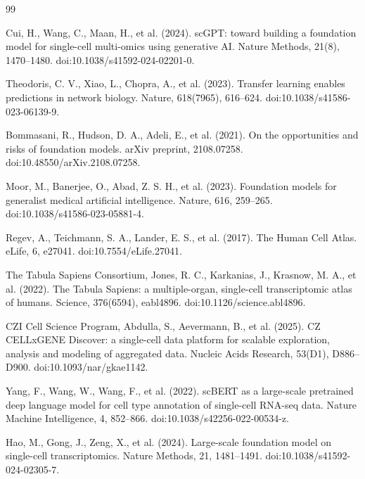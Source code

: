 \documentclass[11pt,a4paper]{article}
\begin{document}
\begin{thebibliography}{99}

Cui, H., Wang, C., Maan, H., et al. (2024).
\newblock scGPT: toward building a foundation model for single-cell multi-omics using generative AI.
\newblock Nature Methods, 21(8), 1470--1480. doi:10.1038/s41592-024-02201-0.

Theodoris, C. V., Xiao, L., Chopra, A., et al. (2023).
\newblock Transfer learning enables predictions in network biology.
\newblock Nature, 618(7965), 616--624. doi:10.1038/s41586-023-06139-9.

Bommasani, R., Hudson, D. A., Adeli, E., et al. (2021).
\newblock On the opportunities and risks of foundation models.
\newblock arXiv preprint, 2108.07258. doi:10.48550/arXiv.2108.07258.

Moor, M., Banerjee, O., Abad, Z. S. H., et al. (2023).
\newblock Foundation models for generalist medical artificial intelligence.
\newblock Nature, 616, 259--265. doi:10.1038/s41586-023-05881-4.

Regev, A., Teichmann, S. A., Lander, E. S., et al. (2017).
\newblock The Human Cell Atlas.
\newblock eLife, 6, e27041. doi:10.7554/eLife.27041.

The Tabula Sapiens Consortium, Jones, R. C., Karkanias, J., Krasnow, M. A., et al. (2022).
\newblock The Tabula Sapiens: a multiple-organ, single-cell transcriptomic atlas of humans.
\newblock Science, 376(6594), eabl4896. doi:10.1126/science.abl4896.

CZI Cell Science Program, Abdulla, S., Aevermann, B., et al. (2025).
\newblock CZ CELLxGENE Discover: a single-cell data platform for scalable exploration, analysis and modeling of aggregated data.
\newblock Nucleic Acids Research, 53(D1), D886--D900. doi:10.1093/nar/gkae1142.

Yang, F., Wang, W., Wang, F., et al. (2022).
\newblock scBERT as a large-scale pretrained deep language model for cell type annotation of single-cell RNA-seq data.
\newblock Nature Machine Intelligence, 4, 852--866. doi:10.1038/s42256-022-00534-z.

Hao, M., Gong, J., Zeng, X., et al. (2024).
\newblock Large-scale foundation model on single-cell transcriptomics.
\newblock Nature Methods, 21, 1481--1491. doi:10.1038/s41592-024-02305-7.


\end{thebibliography}
\end{document}
